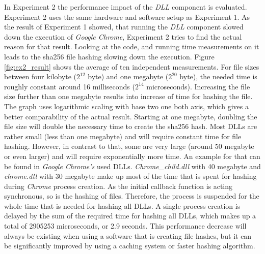 In Experiment 2 the performance impact of the \emph{\gls{DLL}} component is evaluated. Experiment 2 uses the same hardware and software setup as Experiment 1. As the result of Experiment 1 showed, that running the \emph{\gls{DLL}} component slowed down the execution of \emph{Google Chrome}, Experiment 2 tries to find the actual reason for that result. Looking at the code, and running time measurements on it leads to the sha256 file hashing slowing down the execution. Figure \ref{fig:ex2_result} shows the average of ten independent measurements. For file sizes between four kilobyte ($2^{12}$ byte) and one megabyte ($2^{20}$ byte), the needed time is roughly constant around 16 milliseconds ($2^{14}$ microseconds). Increasing the file size further than one megabyte results into increase of time for hashing the file. The graph uses logarithmic scaling with base two one both axis, which gives a better comparability of the actual result. Starting at one megabyte, doubling the file size will double the necessary time to create the sha256 hash. Most \glspl{DLL} are rather small (less than one megabyte) and will require constant time for file hashing. However, in contrast to that, some are very large (around 50 megabyte or even larger) and will require exponentially more time. An example for that can be found in \emph{Google Chrome's} used \glspl{DLL}. \emph{Chrome\_child.dll} with 40 megabyte and \emph{chrome.dll} with 30 megabyte make up most of the time that is spent for hashing during \emph{Chrome} process creation. As the initial callback function  is acting synchronous, so is the hashing of files. Therefore, the process is suspended for the whole time that is needed for hashing all \glspl{DLL}. A single process creation is delayed by the sum of the required time for hashing all \glspl{DLL}, which makes up a total of 2905253 microseconds, or 2.9 seconds. This performance decrease will always be existing when using a software that is creating file hashes, but it can be significantly improved by using a caching system or faster hashing algorithm.